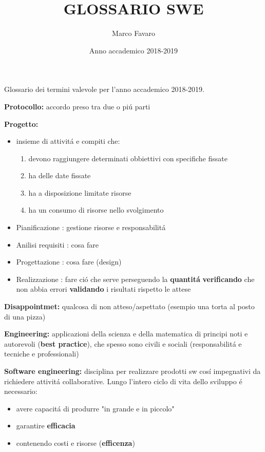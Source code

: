 \documentclass{article}
\title{GLOSSARIO SWE}
\author{Marco Favaro}
\date{Anno accademico 2018-2019}
\begin{document}
 
\maketitle
\centerline{Glossario dei termini valevole per l'anno accademico 2018-2019.}
 

\newpage

\textbf{Protocollo: }accordo preso tra due o pi\'u parti

\bigbreak
\textbf{Progetto: }
    \begin{itemize}
        \item insieme di attivit\'a e compiti che:
        \begin{enumerate}
            \item devono raggiungere determinati obbiettivi con specifiche fissate
            \item ha delle date fissate
            \item ha a disposizione limitate risorse
            \item ha un consumo di risorse nello svolgimento
        \end{enumerate}
        
        \item Pianificazione : gestione risorse e responsabilit\'a
        \item Anilisi requisiti : cosa fare
        \item Progettazione : cosa fare (design)
        \item Realizzazione : fare ci\'o che serve perseguendo la \textbf{quantit\'a}
            \textbf{verificando} che non abbia errori
            \textbf{validando} i risultati rispetto le attese
    \end{itemize}

\bigbreak
\textbf{Disappointmet: }qualcosa di non atteso/aspettato (esempio una torta al posto di una pizza)

\bigbreak
\textbf{Engineering: }applicazioni della scienza e della matematica di principi noti e autorevoli (\textbf{best practice}), che spesso sono civili e sociali (responsabilit\'a e tecniche e professionali)

\bigbreak
\textbf{Software engineering: }disciplina per realizzare prodotti sw cos\'i impegnativi da richiedere attivit\'a collaborative.
Lungo l'intero ciclo di vita dello sviluppo \'e necessario:
    \begin{itemize}
        \item avere capacit\'a di produrre "in grande e in piccolo"
        \item garantire \textbf{efficacia}
        \item contenendo costi e risorse (\textbf{efficenza})
    \end{itemize}
\end{document}

